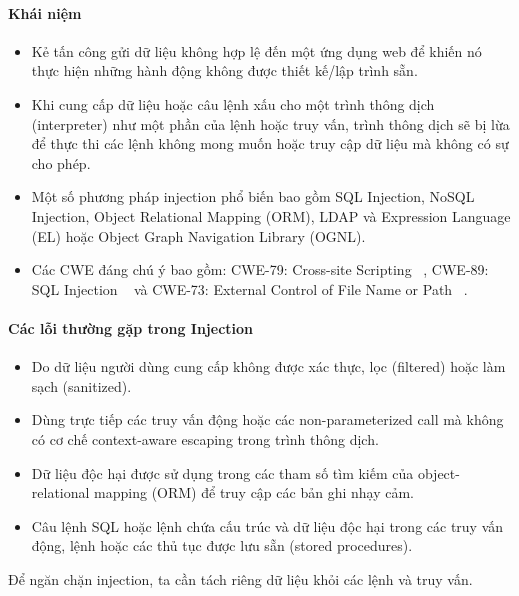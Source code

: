 \paragraph{Khái niệm ~\cite{chap2bib13}}

\begin{itemize}
    \item Kẻ tấn công gửi dữ liệu không hợp lệ đến một ứng dụng web để khiến nó thực hiện những hành động không được thiết kế/lập trình sẵn.
    \item Khi cung cấp dữ liệu hoặc câu lệnh xấu cho một trình thông dịch (interpreter) như một phần của lệnh hoặc truy vấn, trình thông dịch sẽ bị lừa để thực thi các lệnh không mong muốn hoặc truy cập dữ liệu mà không có sự cho phép.
    \item Một số phương pháp injection phổ biến bao gồm SQL Injection, NoSQL Injection, Object Relational Mapping (ORM), LDAP và Expression Language (EL) hoặc Object Graph Navigation Library (OGNL).
    \item Các CWE đáng chú ý bao gồm: CWE-79: Cross-site Scripting ~\cite{chap2bib14}, CWE-89: SQL Injection ~\cite{chap2bib15} và CWE-73: External Control of File Name or Path ~\cite{chap2bib16}.
\end{itemize}

\paragraph{Các lỗi thường gặp trong Injection}

\begin{itemize}
    \item Do dữ liệu người dùng cung cấp không được xác thực, lọc (filtered) hoặc làm sạch (sanitized).
    \item Dùng trực tiếp các truy vấn động hoặc các non-parameterized call mà không có cơ chế context-aware escaping trong trình thông dịch.
    \item Dữ liệu độc hại được sử dụng trong các tham số tìm kiếm của object-relational mapping (ORM) để truy cập các bản ghi nhạy cảm.
    \item Câu lệnh SQL hoặc lệnh chứa cấu trúc và dữ liệu độc hại trong các truy vấn động, lệnh hoặc các thủ tục được lưu sẵn (stored procedures).
\end{itemize}

\tab Để ngăn chặn injection, ta cần tách riêng dữ liệu khỏi các lệnh và truy vấn.

